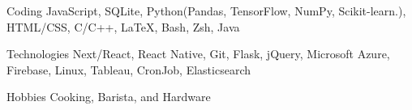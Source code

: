 

\begin{cvskills}

  \cvskill
    {Coding} %
    {JavaScript, SQLite, Python(Pandas, TensorFlow, NumPy, Scikit-learn.), HTML/CSS, C/C++, LaTeX, Bash, Zsh, Java} %

  \cvskill
    {Technologies} %
    {Next/React, React Native, Git, Flask, jQuery, Microsoft Azure, Firebase, Linux, Tableau, CronJob, Elasticsearch} %
    
  \cvskill
    {Hobbies} %
    {Cooking, Barista, and Hardware} %

\end{cvskills}
